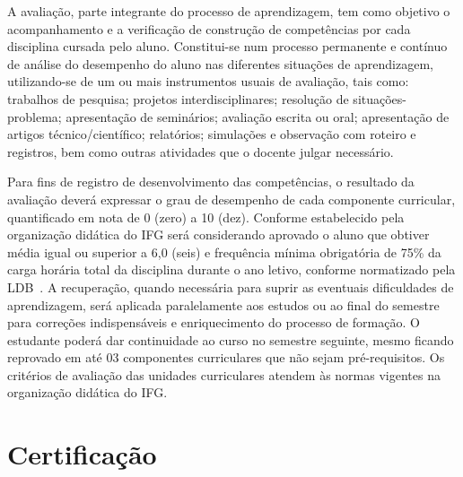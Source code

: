 \documentclass[11pt,fleqn]{book} %
\begin{document}
A avaliação, parte integrante do processo de aprendizagem, tem como objetivo o acompanhamento e a verificação de construção de competências por cada disciplina cursada pelo aluno.
Constitui-se num processo permanente e contínuo de análise do desempenho do aluno nas diferentes situações de aprendizagem, utilizando-se de um ou mais instrumentos usuais de avaliação, tais como: trabalhos de pesquisa; projetos interdisciplinares; resolução de situações-problema; apresentação de seminários; avaliação escrita ou oral; apresentação de artigos técnico/científico; relatórios; simulações e observação com roteiro e registros, bem como outras atividades que o docente julgar necessário.

Para fins de registro de desenvolvimento das competências, o resultado da avaliação deverá expressar o grau de desempenho de cada componente curricular, quantificado em nota de 0 (zero) a 10 (dez). 
Conforme estabelecido pela organização didática do IFG será considerando aprovado o aluno que obtiver média igual ou superior a 6,0 (seis) e frequência mínima obrigatória de 75\% da carga horária total da disciplina durante o ano letivo, conforme normatizado pela LDB~\cite{Lei19394De1996}.
A recuperação, quando necessária para suprir as eventuais dificuldades de aprendizagem, será aplicada paralelamente aos estudos ou ao final do semestre para correções indispensáveis e enriquecimento do processo de formação. 
O estudante poderá dar continuidade ao curso no semestre seguinte, mesmo ficando reprovado em até 03 componentes curriculares que não sejam pré-requisitos. 
Os critérios de avaliação das unidades curriculares atendem às normas vigentes na organização didática do IFG.


\section{Certificação}
\indent
\end{document}
